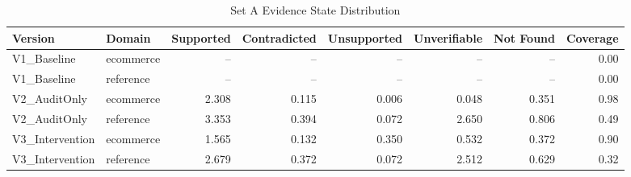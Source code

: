 \begin{table}[t]
\centering
\caption{Set A Evidence State Distribution}
\label{tab:evidence_state}
\begin{tabular}{llrrrrrr}
\toprule
Version & Domain & Supported & Contradicted & Unsupported & Unverifiable & Not Found & Coverage \\
\midrule
V1\_Baseline & ecommerce & -- & -- & -- & -- & -- & 0.00 \\
V1\_Baseline & reference & -- & -- & -- & -- & -- & 0.00 \\
V2\_AuditOnly & ecommerce & 2.308 & 0.115 & 0.006 & 0.048 & 0.351 & 0.98 \\
V2\_AuditOnly & reference & 3.353 & 0.394 & 0.072 & 2.650 & 0.806 & 0.49 \\
V3\_Intervention & ecommerce & 1.565 & 0.132 & 0.350 & 0.532 & 0.372 & 0.90 \\
V3\_Intervention & reference & 2.679 & 0.372 & 0.072 & 2.512 & 0.629 & 0.32 \\
\bottomrule
\end{tabular}
\end{table}
